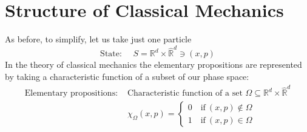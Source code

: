 \documentclass[../main.tex]{subfiles}
\begin{document}
\section[Structure of CM]{Structure of Classical Mechanics}
As before, to simplify, let us take just one particle
\[
\textrm{State: } \quad S = \mathbb{R}^d \times \hat{\mathbb{R}}^d \ni \left(x,p\right)
\]
In the theory of classical mechanics the elementary propositions are represented by taking a characteristic function of a subset of our phase space:
\begin{align*}
    \textrm{Elementary propositions: }& \textrm{Characteristic function of a set } \Omega \subseteq \mathbb{R}^d\times\hat{\mathbb{R}}^d\\
    & \chi_{\Omega}(x,p) = \begin{cases}
    0 \quad \textrm{if} \ (x,p) \notin \Omega\\
    1 \quad \textrm{if} \ (x,p) \in \Omega
    \end{cases}
\end{align*}
\end{document}
